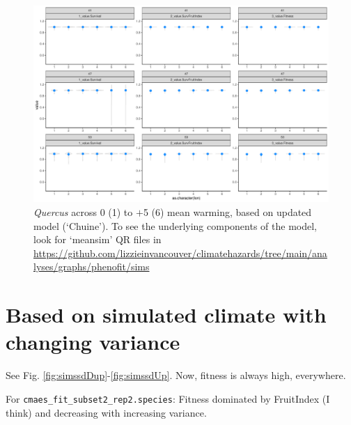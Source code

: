 \documentclass[11pt,letter]{article}
\begin{document}
\begin{figure}[h!]
 \begin{center}
\noindent \includegraphics[width=1\textwidth]{..//analyses/graphs/phenofit/sims/metrics3/meansim_3metricsQR.pdf}
  \caption{\emph{Quercus} across 0 (1) to $+$5 (6) mean warming, based on updated model (`Chuine'). To see the underlying components of the model, look for `meansim' QR files in \url{https://github.com/lizzieinvancouver/climatehazards/tree/main/analyses/graphs/phenofit/sims}}
  \label{fig:simsmeanUp}
  \end{center}
\end{figure}


\clearall
\section*{Based on simulated climate with changing variance}

See Fig. \ref{fig:simssdDup}-\ref{fig:simssdUp}. Now, fitness is always high, everywhere. 

For \verb|cmaes_fit_subset2_rep2.species|: Fitness dominated by FruitIndex (I think) and decreasing with increasing variance.
\end{document}
